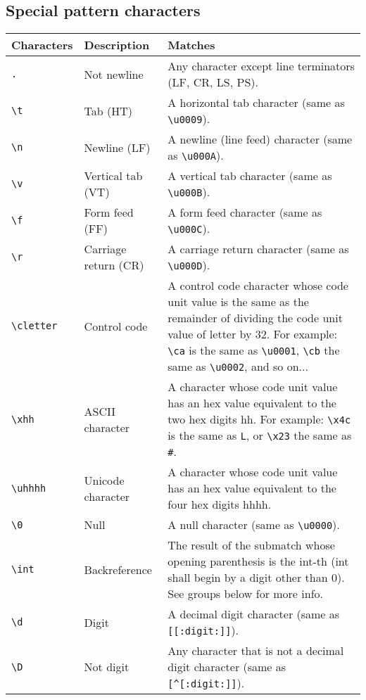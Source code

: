\subsection{Special pattern characters}
\begin{center}
	\begin{tabular}{|M{2cm}|M{3cm}|M{12cm}|}
		\hline
		Characters			&	Description				&	Matches\\
		\hline
		\verb!.!			&	Not newline				&	Any character except line terminators (LF, CR, LS, PS).\\
		\hline
		\verb!\t!			&	Tab (HT)				&	A horizontal tab character (same as \verb!\u0009!).\\
		\hline
		\verb!\n!			&	Newline (LF)			&	A newline (line feed) character (same as \verb!\u000A!).\\
		\hline
		\verb!\v!			&	Vertical tab (VT)		&	A vertical tab character (same as \verb!\u000B!).\\
		\hline
		\verb!\f!			&	Form feed (FF)			&	A form feed character (same as \verb!\u000C!).\\
		\hline
		\verb!\r!			&	Carriage return (CR)	&	A carriage return character (same as \verb!\u000D!).\\
		\hline
		\verb!\cletter!		&	Control code			&	A control code character whose code unit value is the same as the remainder of dividing the code unit value of letter by 32. For example: \verb!\ca! is the same as \verb!\u0001!, \verb!\cb! the same as \verb!\u0002!, and so on...\\
		\hline
		\verb!\xhh!			&	ASCII character			&	A character whose code unit value has an hex value equivalent to the two hex digits hh. For example: \verb!\x4c! is the same as \verb!L!, or \verb!\x23! the same as \verb!#!.\\
		\hline
		\verb!\uhhhh!		&	Unicode character		&	A character whose code unit value has an hex value equivalent to the four hex digits hhhh.\\
		\hline
		\verb!\0!			&	Null					&	A null character (same as \verb!\u0000!).\\
		\hline
		\verb!\int!			&	Backreference			&	The result of the submatch whose opening parenthesis is the int-th (int shall begin by a digit other than 0). See groups below for more info.\\
		\hline
		\verb!\d!			&	Digit					&	A decimal digit character (same as \verb![[:digit:]]!).\\
		\hline
		\verb!\D!			&	Not digit				&	Any character that is not a decimal digit character (same as \verb![^[:digit:]]!).\\

\end{tabular}
\end{center}
